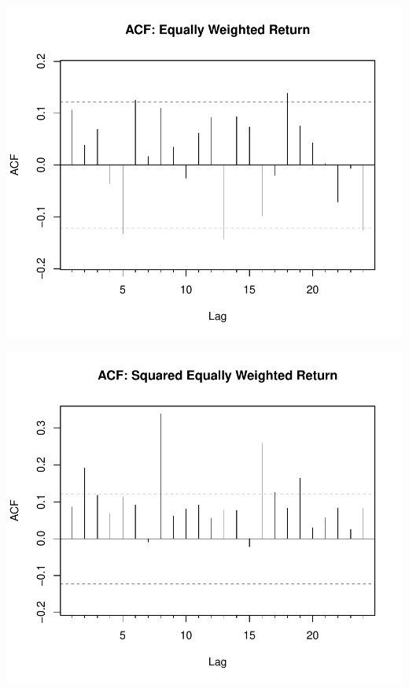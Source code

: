 \documentclass[11pt,preprint, authoryear]{elsarticle}
\numberwithin{equation}{section}
\numberwithin{figure}{section}
\numberwithin{table}{section}
\begin{document}
\includegraphics{FinMetrics-Essay_files/figure-latex/unnamed-chunk-4-1.pdf}

\includegraphics{FinMetrics-Essay_files/figure-latex/unnamed-chunk-5-1.pdf}
\end{document}
